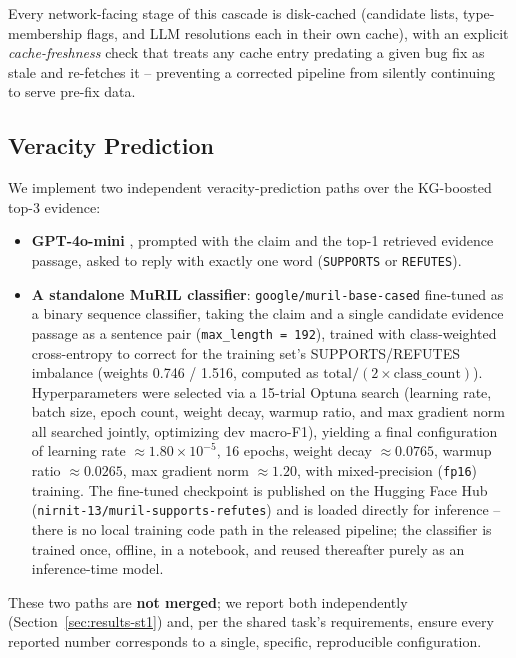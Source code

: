 \documentclass[
]{ceurart}
\begin{document}
Every network-facing stage of this cascade is disk-cached (candidate
lists, type-membership flags, and LLM resolutions each in their own
cache), with an explicit \emph{cache-freshness} check that treats any
cache entry predating a given bug fix as stale and re-fetches it --
preventing a corrected pipeline from silently continuing to serve
pre-fix data.

\subsection{Veracity Prediction}
\label{sec:st1-veracity}

We implement two independent veracity-prediction paths over the
KG-boosted top-3 evidence:

\begin{itemize}
  \item \textbf{GPT-4o-mini} \cite{openai2024gpt4omini}, prompted with
    the claim and the top-1 retrieved evidence passage, asked to reply
    with exactly one word (\texttt{SUPPORTS} or \texttt{REFUTES}).
  \item \textbf{A standalone MuRIL classifier}:
    \texttt{google/muril-base-cased} \cite{khanuja2021muril} fine-tuned
    as a binary sequence classifier, taking the claim and a single
    candidate evidence passage as a sentence pair
    (\texttt{max\_length = 192}), trained with class-weighted
    cross-entropy to correct for the training set's SUPPORTS/REFUTES
    imbalance (weights 0.746 / 1.516, computed as
    $\text{total} / (2 \times \text{class\_count})$). Hyperparameters
    were selected via a 15-trial Optuna search \cite{optuna} (learning
    rate, batch size, epoch count, weight decay, warmup ratio, and max
    gradient norm all searched jointly, optimizing dev macro-F1),
    yielding a final configuration of learning rate
    $\approx 1.80\times10^{-5}$, 16 epochs, weight decay
    $\approx 0.0765$, warmup ratio $\approx 0.0265$, max gradient norm
    $\approx 1.20$, with mixed-precision (\texttt{fp16}) training. The
    fine-tuned checkpoint is published on the Hugging Face Hub
    (\texttt{nirnit-13/muril-supports-refutes}) and is loaded directly
    for inference -- there is no local training code path in the
    released pipeline; the classifier is trained once, offline, in a
    notebook, and reused thereafter purely as an inference-time model.
\end{itemize}

These two paths are \textbf{not merged}; we report both independently
(Section~\ref{sec:results-st1}) and, per the shared task's
requirements, ensure every reported number corresponds to a single,
specific, reproducible configuration.
\end{document}
